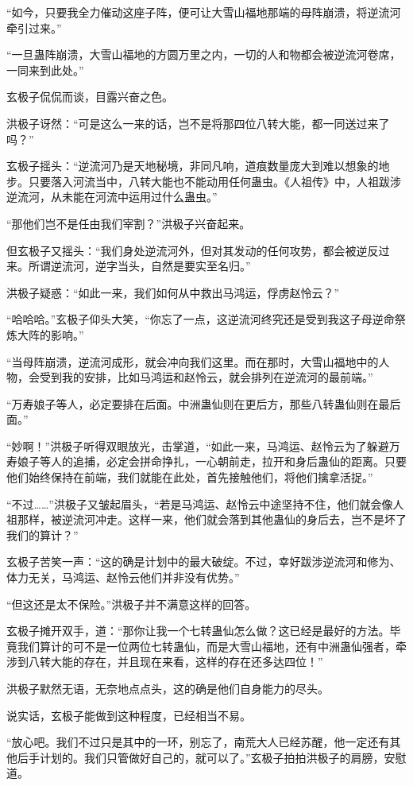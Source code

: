\begin{this_body}
“如今，只要我全力催动这座子阵，便可让大雪山福地那端的母阵崩溃，将逆流河牵引过来。”

“一旦蛊阵崩溃，大雪山福地的方圆万里之内，一切的人和物都会被逆流河卷席，一同来到此处。”

玄极子侃侃而谈，目露兴奋之色。

洪极子讶然：“可是这么一来的话，岂不是将那四位八转大能，都一同送过来了吗？”

玄极子摇头：“逆流河乃是天地秘境，非同凡响，道痕数量庞大到难以想象的地步。只要落入河流当中，八转大能也不能动用任何蛊虫。《人祖传》中，人祖跋涉逆流河，从未能在河流中运用过什么蛊虫。”

“那他们岂不是任由我们宰割？”洪极子兴奋起来。

但玄极子又摇头：“我们身处逆流河外，但对其发动的任何攻势，都会被逆反过来。所谓逆流河，逆字当头，自然是要实至名归。”

洪极子疑惑：“如此一来，我们如何从中救出马鸿运，俘虏赵怜云？”

“哈哈哈。”玄极子仰头大笑，“你忘了一点，这逆流河终究还是受到我这子母逆命祭炼大阵的影响。”

“当母阵崩溃，逆流河成形，就会冲向我们这里。而在那时，大雪山福地中的人物，会受到我的安排，比如马鸿运和赵怜云，就会排列在逆流河的最前端。”

“万寿娘子等人，必定要排在后面。中洲蛊仙则在更后方，那些八转蛊仙则在最后面。”

“妙啊！”洪极子听得双眼放光，击掌道，“如此一来，马鸿运、赵怜云为了躲避万寿娘子等人的追捕，必定会拼命挣扎，一心朝前走，拉开和身后蛊仙的距离。只要他们始终保持在前端，我们就能在此处，首先接触他们，将他们擒拿活捉。”

“不过……”洪极子又皱起眉头，“若是马鸿运、赵怜云中途坚持不住，他们就会像人祖那样，被逆流河冲走。这样一来，他们就会落到其他蛊仙的身后去，岂不是坏了我们的算计？”

玄极子苦笑一声：“这的确是计划中的最大破绽。不过，幸好跋涉逆流河和修为、体力无关，马鸿运、赵怜云他们并非没有优势。”

“但这还是太不保险。”洪极子并不满意这样的回答。

玄极子摊开双手，道：“那你让我一个七转蛊仙怎么做？这已经是最好的方法。毕竟我们算计的可不是一位两位七转蛊仙，而是大雪山福地，还有中洲蛊仙强者，牵涉到八转大能的存在，并且现在来看，这样的存在还多达四位！”

洪极子默然无语，无奈地点点头，这的确是他们自身能力的尽头。

说实话，玄极子能做到这种程度，已经相当不易。

“放心吧。我们不过只是其中的一环，别忘了，南荒大人已经苏醒，他一定还有其他后手计划的。我们只管做好自己的，就可以了。”玄极子拍拍洪极子的肩膀，安慰道。

\end{this_body}

